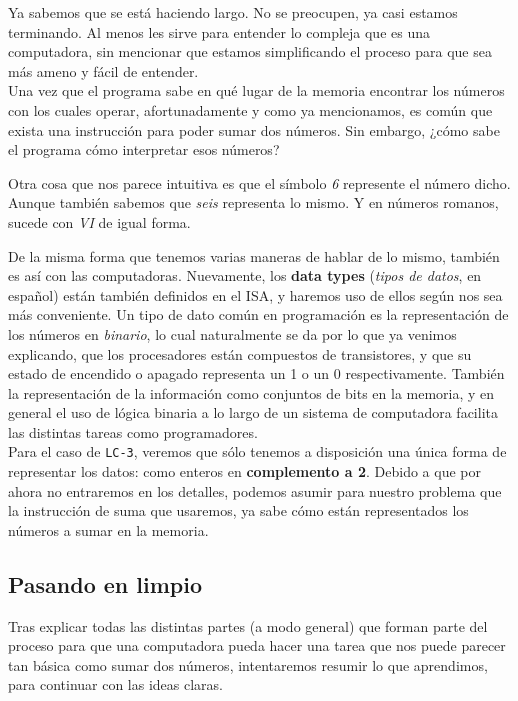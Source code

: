 \documentclass[a4paper, titlepage]{report}
\begin{document}
	Ya sabemos que se está haciendo largo. No se preocupen, ya casi estamos terminando. Al menos les sirve para entender lo compleja que es una computadora, sin mencionar que estamos simplificando el proceso para que sea más ameno y fácil de entender.\\
	
	Una vez que el programa sabe en qué lugar de la memoria encontrar los números con los cuales operar, afortunadamente y como ya mencionamos, es común que exista una instrucción para poder sumar dos números. Sin embargo, ¿cómo sabe el programa cómo interpretar esos números?
	
	Otra cosa que nos parece intuitiva es que el símbolo \textit{6} represente el número dicho. Aunque también sabemos que \textit{seis} representa lo mismo. Y en números romanos, sucede con \textit{VI} de igual forma.
	
	De la misma forma que tenemos varias maneras de hablar de lo mismo, también es así con las computadoras. Nuevamente, los \textbf{data types} (\textit{tipos de datos}, en español) están también definidos en el ISA, y haremos uso de ellos según nos sea más conveniente. Un tipo de dato común en programación es la representación de los números en \textit{binario}, lo cual naturalmente se da por lo que ya venimos explicando, que los procesadores están compuestos de transistores, y que su estado de encendido o apagado representa un 1 o un 0 respectivamente. También la representación de la información como conjuntos de bits en la memoria, y en general el uso de lógica binaria a lo largo de un sistema de computadora facilita las distintas tareas como programadores.\\
	
	Para el caso de \texttt{LC-3}, veremos que sólo tenemos a disposición una única forma de representar los datos: como enteros en \textbf{complemento a 2}. Debido a que por ahora no entraremos en los detalles, podemos asumir para nuestro problema que la instrucción de suma que usaremos, ya sabe cómo están representados los números a sumar en la memoria.
	
	\subsection{Pasando en limpio}
	
	Tras explicar todas las distintas partes (a modo general) que forman parte del proceso para que una computadora pueda hacer una tarea que nos puede parecer tan básica como sumar dos números, intentaremos resumir lo que aprendimos, para continuar con las ideas claras.\\
	
\end{document}
